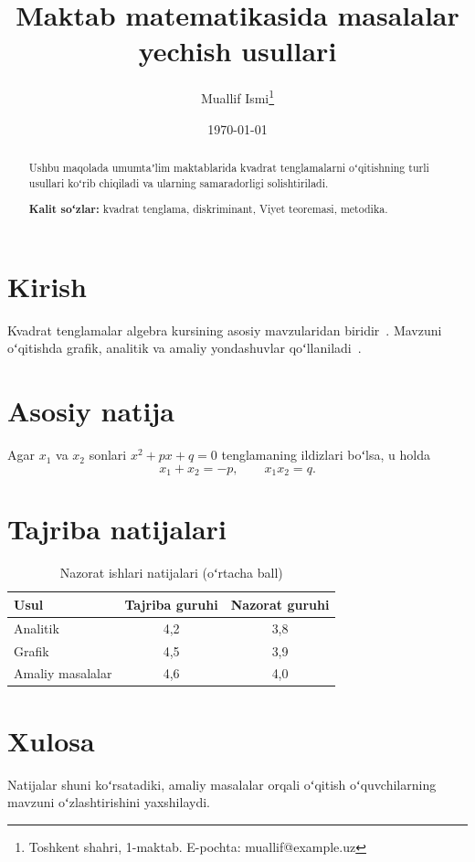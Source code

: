 \documentclass[11pt,a4paper]{article}
\title{Maktab matematikasida masalalar yechish usullari}
\author{Muallif Ismi\thanks{Toshkent shahri, 1-maktab. E-pochta: muallif@example.uz}}
\date{\today}
\begin{document}
\maketitle

\begin{abstract}
  Ushbu maqolada umumtaʼlim maktablarida kvadrat tenglamalarni oʻqitishning
  turli usullari koʻrib chiqiladi va ularning samaradorligi solishtiriladi.
  \par\medskip
  \noindent\textbf{Kalit soʻzlar:} kvadrat tenglama, diskriminant, Viyet teoremasi, metodika.
\end{abstract}

\section{Kirish}

Kvadrat tenglamalar algebra kursining asosiy mavzularidan biridir~\cite{alimov}.
Mavzuni oʻqitishda grafik, analitik va amaliy yondashuvlar qoʻllaniladi~\cite{polya}.

\section{Asosiy natija}

\begin{teorema}[Viyet]
  Agar $x_1$ va $x_2$ sonlari $x^2 + px + q = 0$ tenglamaning ildizlari boʻlsa, u holda
  \begin{equation}
    x_1 + x_2 = -p, \qquad x_1 x_2 = q.
  \end{equation}
\end{teorema}

\section{Tajriba natijalari}

\begin{table}[h]
  \centering
  \caption{Nazorat ishlari natijalari (oʻrtacha ball)}
  \begin{tabular}{lcc}
    \toprule
    Usul & Tajriba guruhi & Nazorat guruhi \\
    \midrule
    Analitik & 4,2 & 3,8 \\
    Grafik & 4,5 & 3,9 \\
    Amaliy masalalar & 4,6 & 4,0 \\
    \bottomrule
  \end{tabular}
\end{table}

\section{Xulosa}

Natijalar shuni koʻrsatadiki, amaliy masalalar orqali oʻqitish oʻquvchilarning
mavzuni oʻzlashtirishini yaxshilaydi.



\end{document}
